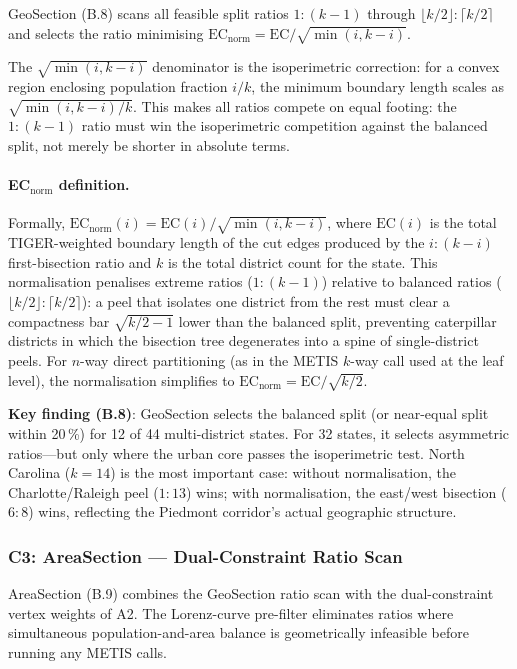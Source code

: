 GeoSection (B.8) scans all feasible split ratios $1:(k-1)$ through
$\lfloor k/2 \rfloor:\lceil k/2 \rceil$ and selects the ratio minimising
$\mathrm{EC}_\text{norm} = \mathrm{EC}/\sqrt{\min(i, k-i)}$.

The $\sqrt{\min(i,k-i)}$ denominator is the isoperimetric correction: for a
convex region enclosing population fraction $i/k$, the minimum boundary length
scales as $\sqrt{\min(i,k-i)/k}$.
This makes all ratios compete on equal footing: the $1:(k-1)$ ratio must win
the isoperimetric competition against the balanced split, not merely be shorter
in absolute terms.

\paragraph{EC$_\text{norm}$ definition.}
Formally, $\mathrm{EC}_\text{norm}(i) = \mathrm{EC}(i) / \sqrt{\min(i, k-i)}$,
where $\mathrm{EC}(i)$ is the total TIGER-weighted boundary length of the cut
edges produced by the $i:(k-i)$ first-bisection ratio and $k$ is the total
district count for the state.
This normalisation penalises extreme ratios ($1:(k-1)$) relative to balanced
ratios ($\lfloor k/2 \rfloor:\lceil k/2 \rceil$): a peel that isolates one
district from the rest must clear a compactness bar $\sqrt{k/2 - 1}$ lower
than the balanced split, preventing caterpillar districts in which the bisection
tree degenerates into a spine of single-district peels.
For $n$-way direct partitioning (as in the METIS $k$-way call used at the
leaf level), the normalisation simplifies to
$\mathrm{EC}_\text{norm} = \mathrm{EC} / \sqrt{k/2}$.

\textbf{Key finding (B.8)}: GeoSection selects the balanced split (or near-equal
split within 20\,\%) for 12 of 44 multi-district states.
For 32 states, it selects asymmetric ratios---but only where the urban core
passes the isoperimetric test.
North Carolina ($k=14$) is the most important case: without normalisation, the
Charlotte/Raleigh peel ($1:13$) wins; with normalisation, the east/west
bisection ($6:8$) wins, reflecting the Piedmont corridor's actual geographic
structure.

\subsubsection*{C3: AreaSection --- Dual-Constraint Ratio Scan}

AreaSection (B.9) combines the GeoSection ratio scan with the dual-constraint
vertex weights of A2.
The Lorenz-curve pre-filter eliminates ratios where simultaneous population-and-area
balance is geometrically infeasible before running any METIS calls.

